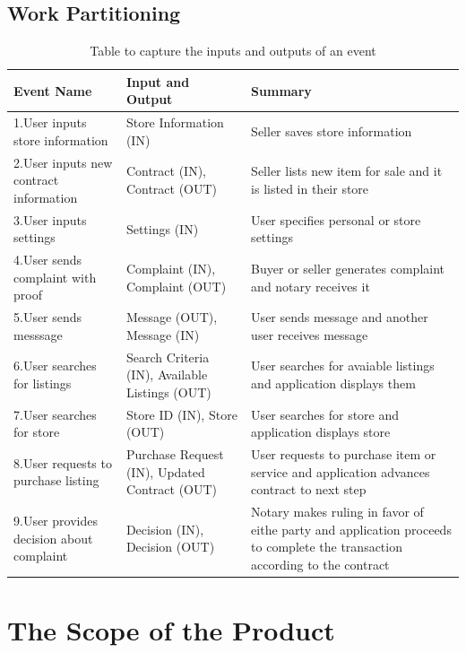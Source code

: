 \documentclass{article}
\begin{document}
\subsection{Work Partitioning}
\begin{table}[H]
\color{red}
\centering
\begin{tabu} to 0.8\textwidth {|| X[l] | X[l] | X[l] ||}
 \hline
 \textbf {Event Name} & \textbf{Input and Output} & \textbf{Summary} \\
 \hline
 1.User inputs store information & Store Information (IN) & Seller saves store information \\
 \hline
 2.User inputs new contract information & Contract (IN), Contract (OUT) & Seller lists new item for sale and it is listed in their store \\
 \hline
 3.User inputs settings & Settings (IN) & User specifies personal or store settings \\
 \hline
 4.User sends complaint with proof & Complaint (IN), Complaint (OUT) & Buyer or seller generates complaint and notary receives it \\
 \hline
 5.User sends messsage & Message (OUT), Message (IN) & User sends message and another user receives message \\
 \hline
 6.User searches for listings & Search Criteria (IN), Available Listings (OUT) & User searches for avaiable listings and application displays them \\
 \hline
 7.User searches for store & Store ID (IN), Store (OUT) & User searches for store and application displays store \\
 \hline
 8.User requests to purchase listing & Purchase Request (IN), Updated Contract (OUT) & User requests to purchase item or service and application advances contract to next step \\
 \hline
 9.User provides decision about complaint & Decision (IN), Decision (OUT) & Notary makes ruling in favor of eithe party and application proceeds to complete the transaction according to the contract \\
 \hline
\end{tabu}
\caption{Table to capture the inputs and outputs of an event}
\label{table:2}
\end{table}

\section{The Scope of the Product}
\end{document}
